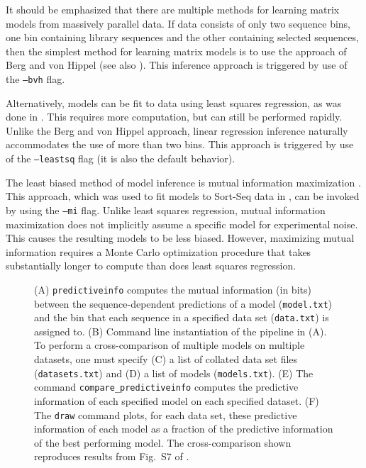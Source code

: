 \documentclass{bmcart}
\begin{document}
It should be emphasized that there are multiple methods for learning matrix models from massively parallel data. If data consists of only two sequence bins, one bin containing library sequences and the other containing selected sequences, then the simplest method for learning matrix models is to use the approach of Berg and von Hippel \cite{Berg:1987wu,Berg:1988td} (see also \cite{Stormo:2000uw}). This inference approach is triggered by use of the \texttt{--bvh} flag. 

Alternatively, models can be fit to data using least squares regression, as was done in \cite{Melnikov:2012dw}. This requires more computation, but can still be performed rapidly. Unlike the Berg and von Hippel approach, linear regression inference naturally accommodates the use of more than two bins. This approach is triggered by use of the \texttt{--leastsq} flag (it is also the default behavior). 

The least biased method of model inference is mutual information maximization \cite{Kinney:2014ge,Atwal:2015wl}. This approach, which was used to fit models to Sort-Seq data in \cite{Kinney:2010tn}, can be invoked by using the \texttt{--mi} flag. Unlike least squares regression, mutual information maximization does not implicitly assume a specific model for experimental noise. This causes the resulting models to be less biased. However, maximizing mutual information requires a Monte Carlo optimization procedure that takes substantially longer to compute than does least squares regression. 

%
%
\begin{figure}[h!]
\caption{
(A) \texttt{predictiveinfo} computes the mutual information (in bits) between the sequence-dependent predictions of a model (\texttt{model.txt}) and the bin that each sequence in a specified data set (\texttt{data.txt}) is assigned to. (B) Command line instantiation of the pipeline in (A). To perform a cross-comparison of multiple models on multiple datasets, one must specify (C) a list of collated data set files (\texttt{datasets.txt}) and (D) a list of models (\texttt{models.txt}). (E) The command \texttt{compare\_predictiveinfo} computes the predictive information of each specified model on each specified dataset. (F) The \texttt{draw} command plots, for each data set, these predictive information of each model as a fraction of the predictive information of the best performing model. The cross-comparison shown reproduces results from Fig.\ S7 of \cite{Kinney:2010tn}. 
}
\label{fig:assessment}
\end{figure}
\end{document}
